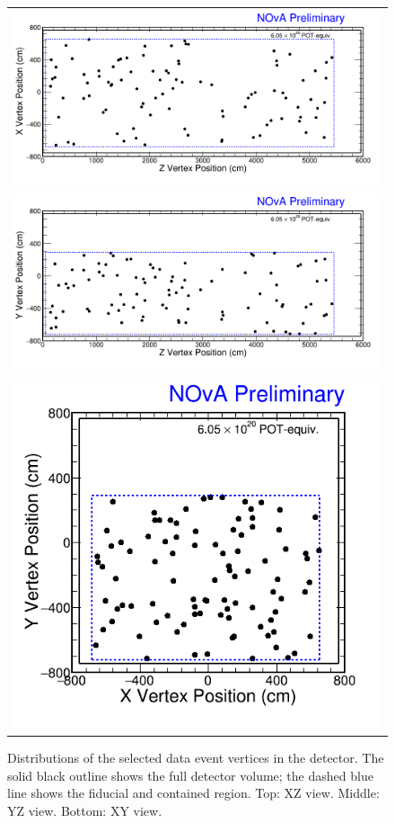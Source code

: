 \begin{figure}[p]
  \centering
  \begin{tabular}{c}
    \includegraphics[width=.8\textwidth]{figures/VtxDistFDXZ.png} \\
    \includegraphics[width=.8\textwidth]{figures/VtxDistFDYZ.png} \\
    \includegraphics[width=.4\textwidth]{figures/VtxDistFDXY.png} \\
  \end{tabular}
  \caption[FD Data Vertex Distributions]{Distributions of the selected data event vertices in the detector. The solid black outline shows the full detector volume; the dashed blue line shows the fiducial and contained region. Top: XZ view. Middle: YZ view. Bottom: XY view.}
  \label{fig:FDDataVtx}
\end{figure}

